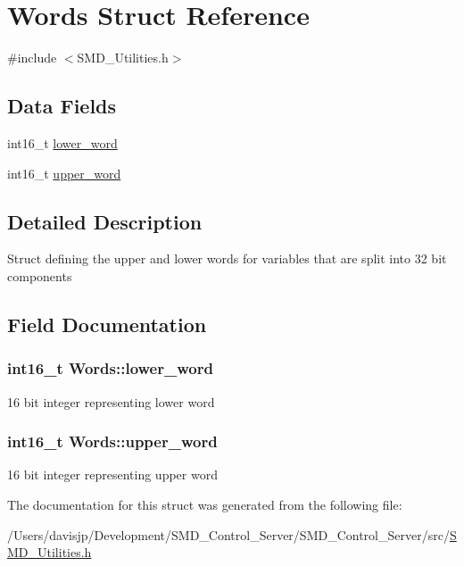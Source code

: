 \hypertarget{struct_words}{}\section{Words Struct Reference}
\label{struct_words}


{\ttfamily \#include $<$S\+M\+D\+\_\+\+Utilities.\+h$>$}

\subsection*{Data Fields}
\begin{DoxyCompactItemize}
\item 
int16\+\_\+t \hyperlink{struct_words_a7fddef805a23dd29dfeee9975f17f09f}{lower\+\_\+word}
\item 
int16\+\_\+t \hyperlink{struct_words_ae99246a69859951d868050bb6ae2a34e}{upper\+\_\+word}
\end{DoxyCompactItemize}


\subsection{Detailed Description}
Struct defining the upper and lower words for variables that are split into 32 bit components 

\subsection{Field Documentation}
\hypertarget{struct_words_a7fddef805a23dd29dfeee9975f17f09f}{}
\subsubsection[{lower\+\_\+word}]{\setlength{\rightskip}{0pt plus 5cm}int16\+\_\+t Words\+::lower\+\_\+word}\label{struct_words_a7fddef805a23dd29dfeee9975f17f09f}
16 bit integer representing lower word \hypertarget{struct_words_ae99246a69859951d868050bb6ae2a34e}{}
\subsubsection[{upper\+\_\+word}]{\setlength{\rightskip}{0pt plus 5cm}int16\+\_\+t Words\+::upper\+\_\+word}\label{struct_words_ae99246a69859951d868050bb6ae2a34e}
16 bit integer representing upper word 

The documentation for this struct was generated from the following file\+:\begin{DoxyCompactItemize}
\item 
/\+Users/davisjp/\+Development/\+S\+M\+D\+\_\+\+Control\+\_\+\+Server/\+S\+M\+D\+\_\+\+Control\+\_\+\+Server/src/\hyperlink{_s_m_d___utilities_8h}{S\+M\+D\+\_\+\+Utilities.\+h}\end{DoxyCompactItemize}
